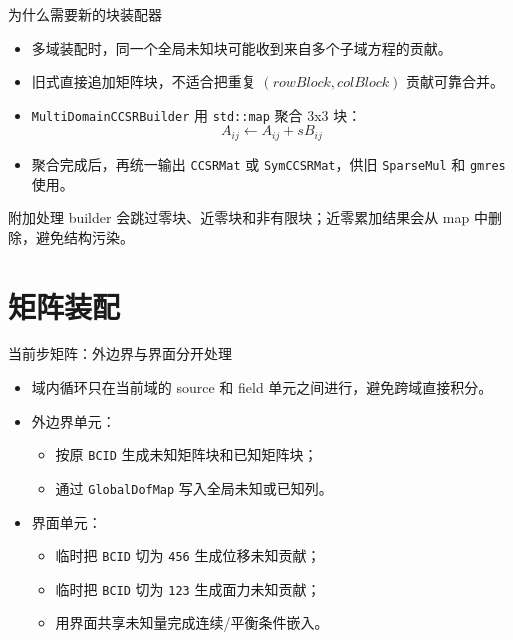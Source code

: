 \documentclass[aspectratio=169,UTF8]{ctexbeamer}
\newcommand{\code}[1]{\texttt{\small #1}}
\begin{document}
\begin{frame}{为什么需要新的块装配器}
  \begin{itemize}
    \item 多域装配时，同一个全局未知块可能收到来自多个子域方程的贡献。
    \item 旧式直接追加矩阵块，不适合把重复 \((rowBlock,colBlock)\) 贡献可靠合并。
    \item \code{MultiDomainCCSRBuilder} 用 \code{std::map} 聚合 3x3 块：
      \[
        A_{ij} \leftarrow A_{ij} + s B_{ij}
      \]
    \item 聚合完成后，再统一输出 \code{CCSRMat} 或 \code{SymCCSRMat}，供旧 \code{SparseMul} 和 \code{gmres} 使用。
  \end{itemize}

  \begin{block}{附加处理}
    builder 会跳过零块、近零块和非有限块；近零累加结果会从 map 中删除，避免结构污染。
  \end{block}
\end{frame}

\section{矩阵装配}

\begin{frame}{当前步矩阵：外边界与界面分开处理}
  \begin{itemize}
    \item 域内循环只在当前域的 source 和 field 单元之间进行，避免跨域直接积分。
    \item 外边界单元：
      \begin{itemize}
        \item 按原 \code{BCID} 生成未知矩阵块和已知矩阵块；
        \item 通过 \code{GlobalDofMap} 写入全局未知或已知列。
      \end{itemize}
    \item 界面单元：
      \begin{itemize}
        \item 临时把 \code{BCID} 切为 \code{456} 生成位移未知贡献；
        \item 临时把 \code{BCID} 切为 \code{123} 生成面力未知贡献；
        \item 用界面共享未知量完成连续/平衡条件嵌入。
      \end{itemize}
  \end{itemize}
\end{frame}
\end{document}
